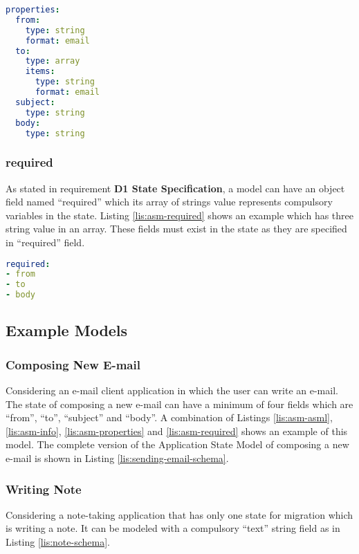 \lstset{
  label=lis:asm-properties, caption=Application State Model “properties” field example.
}
\begin{lstlisting}[language=yaml]
properties:
  from:
    type: string
    format: email
  to:
    type: array
    items:
      type: string
      format: email
  subject:
    type: string
  body:
    type: string

\end{lstlisting}
\subsubsection{required}
As stated in requirement \textbf{D1 State Specification}, a model can have an object field named “required” which its array of strings value represents compulsory variables in the state.
Listing \ref{lis:asm-required} shows an example which has three string value in an array. These fields must exist in the state as they are specified in “required” field.

\lstset{
  label=lis:asm-required, caption=Application State Model “required” field example.
}
\begin{lstlisting}[language=yaml]
required:
- from
- to
- body

\end{lstlisting}

\subsection{Example Models}
\subsubsection{Composing New E-mail}
Considering an e-mail client application in which the user can write an e-mail. The state of composing a new e-mail can have a minimum of four fields which are “from”, “to”, “subject” and “body”. A combination of Listings \ref{lis:asm-asml},  \ref{lis:asm-info},  \ref{lis:asm-properties} and  \ref{lis:asm-required} shows an example of this model.
The complete version of the Application State Model of composing a new e-mail is shown in Listing \ref{lis:sending-email-schema}.
\subsubsection{Writing Note}
Considering a note-taking application that has only one state for migration which is writing a note. It can be modeled with a compulsory “text” string field as in Listing \ref{lis:note-schema}.

